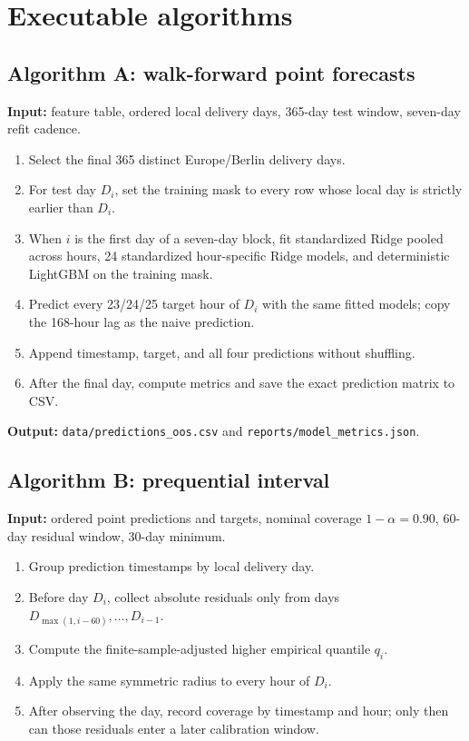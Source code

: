 \documentclass[11pt]{article}
\begin{document}
\section{Executable algorithms}

\subsection{Algorithm A: walk-forward point forecasts}

\textbf{Input:} feature table, ordered local delivery days, 365-day test
window, seven-day refit cadence.

\begin{enumerate}[leftmargin=*]
  \item Select the final 365 distinct Europe/Berlin delivery days.
  \item For test day $D_i$, set the training mask to every row whose local day
  is strictly earlier than $D_i$.
  \item When $i$ is the first day of a seven-day block, fit standardized Ridge
  pooled across hours, 24 standardized hour-specific Ridge models, and
  deterministic LightGBM on the training mask.
  \item Predict every 23/24/25 target hour of $D_i$ with the same fitted
  models; copy the 168-hour lag as the naive prediction.
  \item Append timestamp, target, and all four predictions without shuffling.
  \item After the final day, compute metrics and save the exact prediction
  matrix to CSV.
\end{enumerate}

\textbf{Output:} \texttt{data/predictions\_oos.csv} and
\texttt{reports/model\_metrics.json}.

\subsection{Algorithm B: prequential interval}

\textbf{Input:} ordered point predictions and targets, nominal coverage
$1-\alpha=0.90$, 60-day residual window, 30-day minimum.

\begin{enumerate}[leftmargin=*]
  \item Group prediction timestamps by local delivery day.
  \item Before day $D_i$, collect absolute residuals only from days
  $D_{\max(1,i-60)},\ldots,D_{i-1}$.
  \item Compute the finite-sample-adjusted higher empirical quantile $q_i$.
  \item Apply the same symmetric radius to every hour of $D_i$.
  \item After observing the day, record coverage by timestamp and hour; only
  then can those residuals enter a later calibration window.
\end{enumerate}
\end{document}
